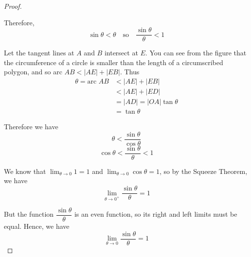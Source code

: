 \begin{proof}
\begin{center}
\end{center}

Therefore,
\[ \sin \theta < \theta \quad \text{so} \quad \frac{\sin \theta}{\theta} < 1 \]

Let the tangent lines at $A$ and $B$ intersect at $E$. You can see from the figure that the circumference of a circle is smaller than the length of a circumscribed polygon, and so arc $AB < |AE| + |EB|$. Thus
\begin{align*}
    \theta = \text{arc } AB &< |AE| + |EB| \\
    &< |AE| + |ED| \\
    &= |AD| = |OA| \tan \theta \\
    &= \tan \theta
\end{align*}

Therefore we have
\[ \theta < \frac{\sin \theta}{\cos \theta} \]
\[ \cos \theta < \frac{\sin \theta}{\theta} < 1 \]

We know that $\lim_{\theta \to 0} 1 = 1$ and $\lim_{\theta \to 0} \cos \theta = 1$, so by the Squeeze Theorem, we have
\[ \lim_{\theta \to 0^+} \frac{\sin \theta}{\theta} = 1 \]

But the function $\dfrac{\sin \theta}{\theta}$ is an even function, so its right and left limits must be equal. Hence, we have
\[ \lim_{\theta \to 0} \frac{\sin \theta}{\theta} = 1 \]
\end{proof}
\pagebreak
